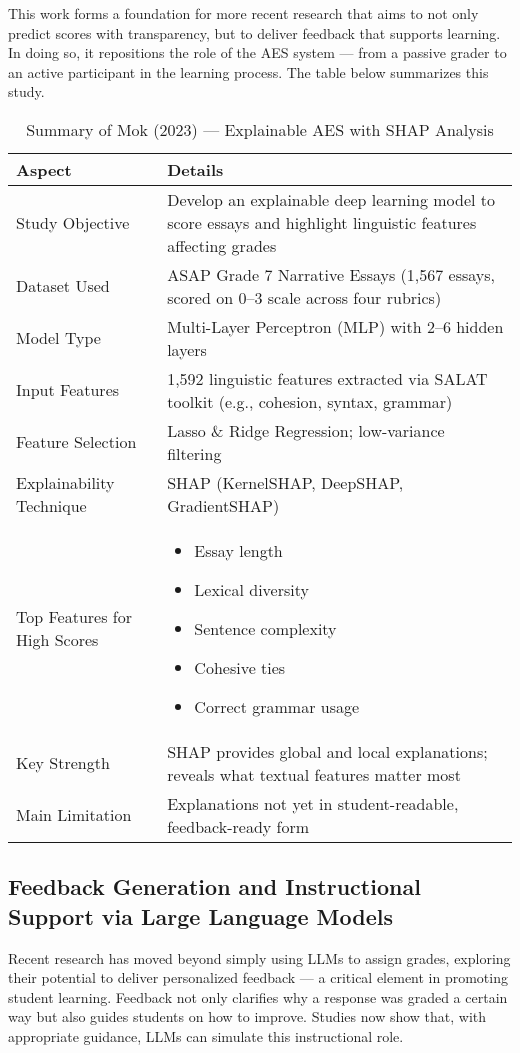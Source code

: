 \documentclass[a4paper,twoside,12pt]{report}
\begin{document}
This work forms a foundation for more recent research that aims to not only predict scores with transparency, but to deliver feedback that supports learning. In doing so, it repositions the role of the AES system — from a passive grader to an active participant in the learning process.
The table below summarizes this study.
\begin{table}[h!]
  \centering
  \begin{tabular}{|p{4.5cm}|p{10.5cm}|}
  \hline
  \textbf{Aspect} & \textbf{Details} \\
  \hline
  Study Objective & Develop an explainable deep learning model to score essays and highlight linguistic features affecting grades \\
  \hline
  Dataset Used & ASAP Grade 7 Narrative Essays (1,567 essays, scored on 0–3 scale across four rubrics) \\
  \hline
  Model Type & Multi-Layer Perceptron (MLP) with 2–6 hidden layers \\
  \hline
  Input Features & 1,592 linguistic features extracted via SALAT toolkit (e.g., cohesion, syntax, grammar) \\
  \hline
  Feature Selection & Lasso \& Ridge Regression; low-variance filtering \\
  \hline
  Explainability Technique & SHAP (KernelSHAP, DeepSHAP, GradientSHAP) \\
  \hline
  Top Features for High Scores & 
  \begin{itemize}
    \item Essay length
    \item Lexical diversity
    \item Sentence complexity
    \item Cohesive ties
    \item Correct grammar usage
  \end{itemize} \\
  \hline
  Key Strength & SHAP provides global and local explanations; reveals what textual features matter most \\
  \hline
  Main Limitation & Explanations not yet in student-readable, feedback-ready form \\
  \hline
  \end{tabular}
  \caption{Summary of Mok (2023) — Explainable AES with SHAP Analysis}
  \label{tab:mok2023_summary}
  \end{table}
  
  \subsection{Feedback Generation and Instructional Support via Large Language Models}
  Recent research has moved beyond simply using LLMs to assign grades, exploring their potential to deliver personalized feedback — a critical element in promoting student learning. Feedback not only clarifies why a response was graded a certain way but also guides students on how to improve. Studies now show that, with appropriate guidance, LLMs can simulate this instructional role.
\end{document}
